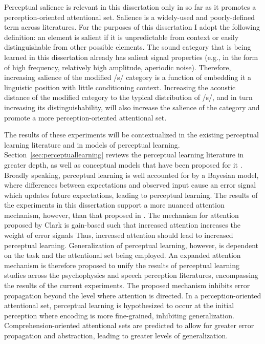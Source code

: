Perceptual salience is relevant in this dissertation only in so far as it promotes a perception-oriented attentional set.
Salience is a widely-used and poorly-defined term across literatures.
For the purposes of this dissertation I adopt the following definition:  an element is salient if it is unpredictable from context or easily distinguishable from other possible elements.  
The sound category that is being learned in this dissertation already has salient signal properties (e.g., in the form of high frequency, relatively high amplitude, aperiodic noise).
Therefore, increasing salience of the modified /s/ category is a function of embedding it a linguistic position with little conditioning context.  
Increasing the acoustic distance of the modified category to the typical distribution of /s/, and in turn increasing its distinguishability, will also increase the salience of the category and promote a more perception-oriented attentional set.

The results of these experiments will be contextualized in the existing perceptual learning literature and in models of perceptual learning.
Section~\ref{sec:perceptuallearning} reviews the perceptual learning literature in greater depth, as well as conceptual models that have been proposed for it \citep{Clark2013, Kleinschmidt2011}.
Broadly speaking, perceptual learning is well accounted for by a Bayesian model, where differences between expectations and observed input cause an error signal which updates future expectations, leading to perceptual learning.
The results of the experiments in this dissertation support a more nuanced attention mechanism, however, than that proposed in \citet{Clark2013}.
The mechanism for attention proposed by Clark is gain-based such that increased attention increases the weight of error signals
Thus, increased attention should lead to increased perceptual learning.
Generalization of perceptual learning, however, is dependent on the task and the attentional set being employed.
An expanded attention mechanism is therefore proposed to unify the results of perceptual learning studies across the psychophysics and speech perception literatures, encompassing the results of the current experiments.
The proposed mechanism inhibits error propagation beyond the level where attention is directed.  
In a perception-oriented attentional set, perceptual learning is hypothesized to occur at the initial perception where encoding is more fine-grained, inhibiting generalization.  
Comprehension-oriented attentional sets are predicted to allow for greater error propagation and abstraction, leading to greater levels of generalization.

